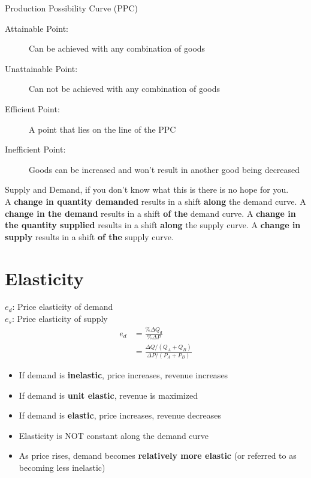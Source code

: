 \begin{note}{Production Possibility Curve (PPC)}
	\begin{description}
		\item[Attainable Point:] Can be achieved with any combination of goods
		\item[Unattainable Point:] Can not be achieved with any combination of goods
		\item[Efficient Point:] A point that lies on the line of the PPC
		\item[Inefficient Point:] Goods can be increased and won't result in another good being decreased
	\end{description}
\end{note}

Supply and Demand, if you don't know what this is there is no hope for you.\\

A \textbf{change in quantity demanded} results in a shift \textbf{along} the demand curve. A \textbf{change in the demand} results in a shift \textbf{of the} demand curve. A \textbf{change in the quantity supplied} results in a shift \textbf{along} the supply curve. A \textbf{change in supply} results in a shift \textbf{of the} supply curve.

\section{Elasticity}
$e_d$: Price elasticity of demand\\
$e_s$: Price elasticity of supply\\
\begin{align*}
	e_d &= \frac{\%\Delta Q_d}{\%\Delta P}\\
	&= \frac{\Delta Q/(Q_A+Q_B)}{\Delta P/(P_A+P_B)}
\end{align*}
\begin{itemize}
	\item If demand is \textbf{inelastic}, price increases, revenue increases
	\item If demand is \textbf{unit elastic}, revenue is maximized
	\item If demand is \textbf{elastic}, price increases, revenue decreases
	\item Elasticity is NOT constant along the demand curve
	\item As price rises, demand becomes \textbf{relatively more elastic} (or referred to as becoming less inelastic)
\end{itemize}

